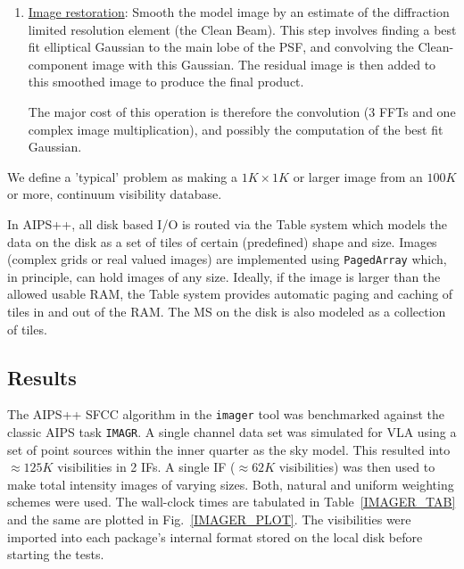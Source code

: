 \begin{enumerate}
\item \underline{Image restoration}: Smooth the model image by an
estimate of the diffraction limited resolution element (the Clean
Beam).
\label{MakeCI}
This step involves finding a best fit elliptical Gaussian to the main
lobe of the PSF, and convolving the Clean-component image with this
Gaussian.  The residual image is then added to this smoothed image to
produce the final product.

The major cost of this operation is therefore the convolution (3 FFTs
and one complex image multiplication), and possibly the computation of
the best fit Gaussian.

\end{enumerate}

We define a 'typical' problem as making a $1K\times1K$ or larger image
from an $100K$ or more, continuum visibility database.

In AIPS++, all disk based I/O is routed via the Table system which
models the data on the disk as a set of tiles of certain (predefined)
shape and size.  Images (complex grids or real valued images) are
implemented using {\tt PagedArray} which, in principle, can hold
images of any size.  Ideally, if the image is larger than the allowed
usable RAM, the Table system provides automatic paging and caching of
tiles in and out of the RAM.  The MS on the disk is also modeled as a
collection of tiles.


\subsection{Results}

The AIPS++ SFCC algorithm in the {\tt imager} tool was benchmarked
against the classic AIPS task {\tt IMAGR}.  A single channel data set
was simulated for VLA using a set of point sources within the inner
quarter as the sky model.  This resulted into $\approx 125K$
visibilities in 2 IFs.  A single IF ($\approx 62K$ visibilities) was
then used to make total intensity images of varying sizes.  Both,
natural and uniform weighting schemes were used.  The wall-clock times
are tabulated in Table~\ref{IMAGER_TAB} and the same are plotted in
Fig.~\ref{IMAGER_PLOT}.  The visibilities were imported into each
package's internal format stored on the local disk before starting the
tests.

%
%


